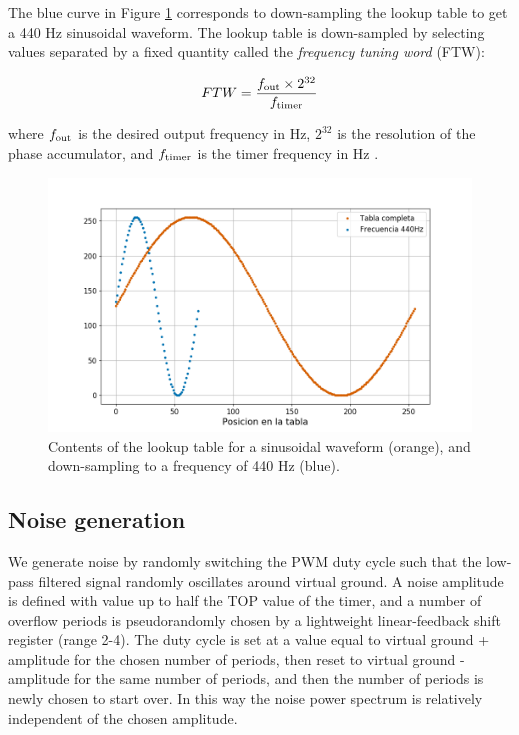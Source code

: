 \documentclass[twocolumn]{article}
\begin{document}
The blue curve in Figure \ref{fig.TablaSenoCompletay440} corresponds to down-sampling the lookup table to get a 440 Hz sinusoidal waveform. The lookup table is down-sampled by selecting values separated by a fixed quantity called the {\em frequency tuning word} (FTW):

\begin{equation}
    FTW = \frac{f_{\mbox{\scriptsize out}} \times 2^{32}}{f_{\mbox{\scriptsize timer}}}
\end{equation}

\noindent where $f_{\mbox{\scriptsize out}}$ is the desired output frequency in Hz, $2^{32}$ is the resolution of the phase accumulator, and $f_{\mbox{\scriptsize timer}}$ is the timer frequency in Hz \cite{ftw}.


\begin{figure}[ht]
    \centering
        \includegraphics[width=\linewidth]{figures/Esquema_LUT_Sin.png}
        \caption{Contents of the lookup table for a sinusoidal waveform (orange), and down-sampling to a frequency of 440 Hz (blue).}
        \label{fig.TablaSenoCompletay440}
\end{figure}



\subsection{Noise generation}
\label{sec.noise}

We generate noise by randomly switching the PWM duty cycle such that the low-pass filtered signal randomly oscillates around virtual ground. A noise amplitude is defined with value up to half the TOP value of the timer, and a number of overflow periods is pseudorandomly chosen by a lightweight linear-feedback shift register \cite{galoisLFSR} (range 2-4). The duty cycle is set at a value equal to virtual ground + amplitude for the chosen number of periods, then reset to virtual ground - amplitude for the same number of periods, and then the number of periods is newly chosen to start over. In this way the noise power spectrum is relatively independent of the chosen amplitude.
\end{document}

